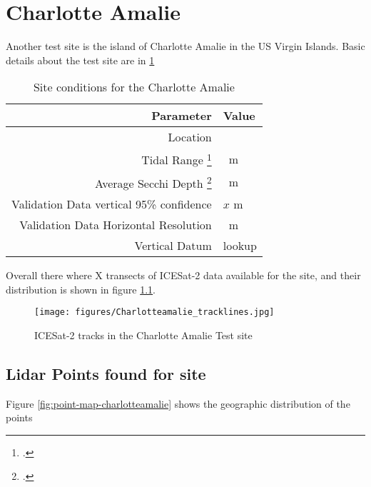 \section{Charlotte Amalie}
Another test site is the island of Charlotte Amalie in the US Virgin Islands. Basic details about the test site are in \ref{table:charlotteamalie_datatable}
\begin{table}[htbp]
    \begin{minipage}{0.5\textwidth}
        \centering\begin{tabular}{r l }
            Parameter                                                 & \textbf{Value} \\
            \hline
            Location                                                  &                \\
            Tidal Range \footcite{tidal_data_reanalysis2022}          & \qty{}{m}      \\
            Average Secchi Depth \footcite{ACRI-STGlobColourTeam2020} & \qty{}{m}      \\
            Validation Data vertical 95\% confidence                  & $x$ m          \\
            Validation Data Horizontal Resolution                     & \qty{}{m}      \\
            Vertical Datum                                            & lookup         \\
        \end{tabular}
    \end{minipage}
    \caption{Site conditions for the Charlotte Amalie}
    \label{table:charlotteamalie_datatable}
\end{table}
Overall there where X  transects of ICESat-2 data available for the site, and their distribution is shown in figure \ref{}.

\begin{figure}[htbp]
    \centering
    \texttt{[image: figures/Charlotteamalie\_tracklines.jpg]}
    \caption{ICESat-2 tracks in the Charlotte Amalie Test site}
    \label{fig:charlotteamalie-tracklines}
\end{figure}

\subsection{Lidar Points found for site}
Figure \ref{fig:point-map-charlotteamalie} shows the geographic distribution of the points

